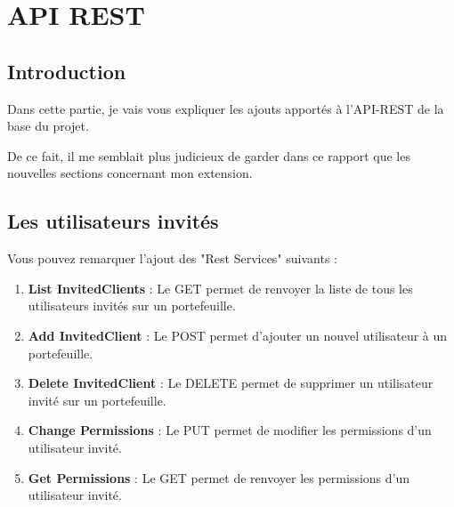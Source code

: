 \section{API REST}

\subsection{Introduction}

\begin{flushleft}
Dans cette partie, je vais vous expliquer les ajouts apportés à l'API-REST de la base du projet. 
\end{flushleft}
\begin{flushleft}
De ce fait, il me semblait plus judicieux de garder dans ce rapport que les nouvelles sections concernant mon extension.
\end{flushleft}

\subsection{Les utilisateurs invités}

\begin{flushleft}
Vous pouvez remarquer l'ajout des "Rest Services" suivants :
\end{flushleft}

\begin{enumerate}
\item \textbf{List InvitedClients} :\newline
Le GET permet de renvoyer la liste de tous les utilisateurs invités sur un portefeuille.
\item \textbf{Add InvitedClient} :\newline
Le POST permet d'ajouter un nouvel utilisateur à un portefeuille.
\item \textbf{Delete InvitedClient} :\newline
Le DELETE permet de supprimer un utilisateur invité sur un portefeuille.
\item \textbf{Change Permissions} :\newline
Le PUT permet de modifier les permissions d'un utilisateur invité.
\item \textbf{Get Permissions} :\newline
Le GET permet de renvoyer les permissions d'un utilisateur invité.
\end{enumerate}


